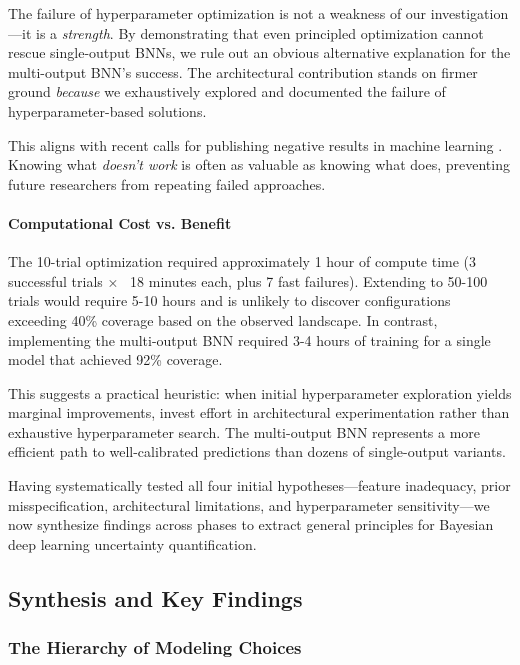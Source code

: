 The failure of hyperparameter optimization is not a weakness of our investigation—it is a \textit{strength}. By demonstrating that even principled optimization cannot rescue single-output BNNs, we rule out an obvious alternative explanation for the multi-output BNN's success. The architectural contribution stands on firmer ground \textit{because} we exhaustively explored and documented the failure of hyperparameter-based solutions.

This aligns with recent calls for publishing negative results in machine learning \citep{sculley2018winner}. Knowing what \textit{doesn't work} is often as valuable as knowing what does, preventing future researchers from repeating failed approaches.

\paragraph{Computational Cost vs. Benefit}

The 10-trial optimization required approximately 1 hour of compute time (3 successful trials × ~18 minutes each, plus 7 fast failures). Extending to 50-100 trials would require 5-10 hours and is unlikely to discover configurations exceeding 40\% coverage based on the observed landscape. In contrast, implementing the multi-output BNN required 3-4 hours of training for a single model that achieved 92\% coverage.

This suggests a practical heuristic: when initial hyperparameter exploration yields marginal improvements, invest effort in architectural experimentation rather than exhaustive hyperparameter search. The multi-output BNN represents a more efficient path to well-calibrated predictions than dozens of single-output variants.

Having systematically tested all four initial hypotheses—feature inadequacy, prior misspecification, architectural limitations, and hyperparameter sensitivity—we now synthesize findings across phases to extract general principles for Bayesian deep learning uncertainty quantification.

\subsection{Synthesis and Key Findings}
\label{subsec:synthesis}

\subsubsection{The Hierarchy of Modeling Choices}

